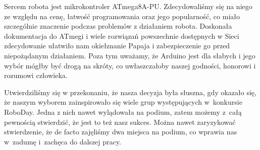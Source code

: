 Sercem robota jest mikrokontroler ATmega8A-PU. Zdecydowaliśmy się na niego ze względu na cenę, łatwość programowania oraz jego popularność, co miało szczególnie znaczenie podczas problemów z działaniem robota. Doskonała dokumentacja do ATmegi i wiele rozwiązań powszechnie dostępnych w Sieci zdecydowanie ułatwiło nam okiełznanie Papaja i zabezpieczenie go przed niepożądanym działaniem. Poza tym uważamy, że Arduino jest dla słabych i jego wybór mógłby być drogą na skróty, co uwłaszczałoby naszej godności, honorowi i rozumowi człowieka.

Utwierdziliśmy się w przekonaniu, że nasza decyzja była słuszna, gdy okazało się, że naszym wyborem zainspirowało się wiele grup występujących w~konkursie RoboDay. Jedna z nich nawet wylądowała na podium, zatem możemy z~całą pewnością stwierdzić, że jest to też nasz sukces. Można nawet zaryzykować stwierdzenie, że de facto zajęliśmy dwa miejsca na podium, co wprawia nas w~zadumę i~zachęca do dalszej pracy.


